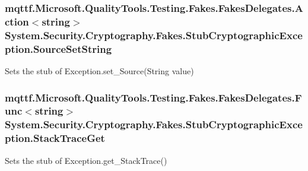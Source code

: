 \hypertarget{class_system_1_1_security_1_1_cryptography_1_1_fakes_1_1_stub_cryptographic_exception_a97fb47c452b521d6b13b988464930cc8}{
\subsubsection[{Source\-Set\-String}]{\setlength{\rightskip}{0pt plus 5cm}mqttf.\-Microsoft.\-Quality\-Tools.\-Testing.\-Fakes.\-Fakes\-Delegates.\-Action$<$string$>$ System.\-Security.\-Cryptography.\-Fakes.\-Stub\-Cryptographic\-Exception.\-Source\-Set\-String}}\label{class_system_1_1_security_1_1_cryptography_1_1_fakes_1_1_stub_cryptographic_exception_a97fb47c452b521d6b13b988464930cc8}


Sets the stub of Exception.\-set\-\_\-\-Source(\-String value)

\hypertarget{class_system_1_1_security_1_1_cryptography_1_1_fakes_1_1_stub_cryptographic_exception_afa5ee90c8410e29f370b0c19ba735e11}{
\subsubsection[{Stack\-Trace\-Get}]{\setlength{\rightskip}{0pt plus 5cm}mqttf.\-Microsoft.\-Quality\-Tools.\-Testing.\-Fakes.\-Fakes\-Delegates.\-Func$<$string$>$ System.\-Security.\-Cryptography.\-Fakes.\-Stub\-Cryptographic\-Exception.\-Stack\-Trace\-Get}}\label{class_system_1_1_security_1_1_cryptography_1_1_fakes_1_1_stub_cryptographic_exception_afa5ee90c8410e29f370b0c19ba735e11}


Sets the stub of Exception.\-get\-\_\-\-Stack\-Trace()

